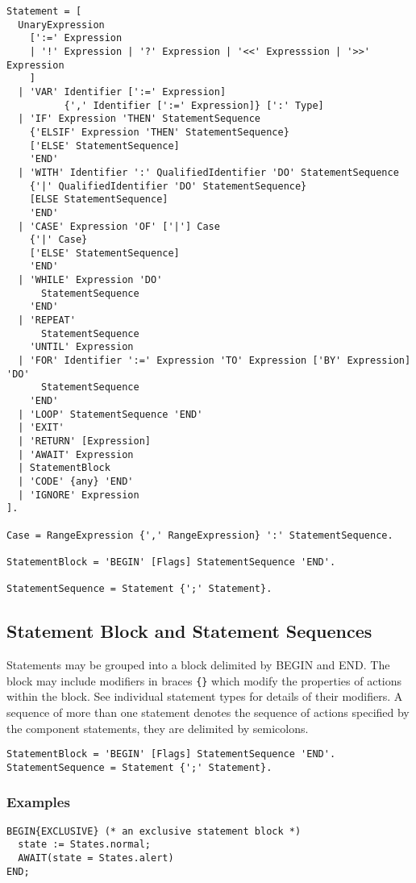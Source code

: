 \documentclass[a4wide,11pt]{article}
\begin{document}
\begin{lstlisting}[style=ebnf]
Statement = [
  UnaryExpression
    [':=' Expression
    | '!' Expression | '?' Expression | '<<' Expresssion | '>>' Expression
    ]
  | 'VAR' Identifier [':=' Expression] 
          {',' Identifier [':=' Expression]} [':' Type]
  | 'IF' Expression 'THEN' StatementSequence
    {'ELSIF' Expression 'THEN' StatementSequence}
    ['ELSE' StatementSequence]
    'END'
  | 'WITH' Identifier ':' QualifiedIdentifier 'DO' StatementSequence
    {'|' QualifiedIdentifier 'DO' StatementSequence}
    [ELSE StatementSequence]
    'END'
  | 'CASE' Expression 'OF' ['|'] Case
    {'|' Case}
    ['ELSE' StatementSequence]
    'END'
  | 'WHILE' Expression 'DO'
      StatementSequence
    'END'
  | 'REPEAT'
      StatementSequence
    'UNTIL' Expression
  | 'FOR' Identifier ':=' Expression 'TO' Expression ['BY' Expression] 'DO'
      StatementSequence
    'END'
  | 'LOOP' StatementSequence 'END'
  | 'EXIT'
  | 'RETURN' [Expression]
  | 'AWAIT' Expression
  | StatementBlock
  | 'CODE' {any} 'END'
  | 'IGNORE' Expression
].

Case = RangeExpression {',' RangeExpression} ':' StatementSequence.

StatementBlock = 'BEGIN' [Flags] StatementSequence 'END'.

StatementSequence = Statement {';' Statement}.
\end{lstlisting}

\subsection{Statement Block and Statement Sequences}
Statements may be grouped into a block delimited by BEGIN and END.
The block may include modifiers in braces \lstinline"{}"  which modify the properties of actions within the block.
See individual statement types for details of their modifiers.
A sequence of  more than one statement denotes the sequence of actions specified by the component statements, they are delimited by semicolons.

\begin{lstlisting}[style=ebnf]
StatementBlock = 'BEGIN' [Flags] StatementSequence 'END'.
StatementSequence = Statement {';' Statement}.
\end{lstlisting}

\begin{annotation}
\subsubsection{Examples}
\begin{lstlisting}[style=example]
BEGIN{EXCLUSIVE} (* an exclusive statement block *)
  state := States.normal;
  AWAIT(state = States.alert)
END;
\end{lstlisting}
\end{annotation}
\end{document}

